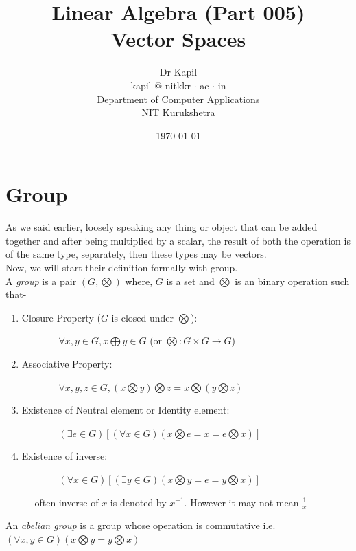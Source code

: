\documentclass{article}
\title{Linear Algebra (Part 005)\\Vector Spaces}
\author{Dr Kapil\\kapil $@$ nitkkr $\cdot$ ac $\cdot$ in\\Department of Computer Applications\\ NIT Kurukshetra}
\date{\today}
\begin{document}
\maketitle
\thispagestyle{fancy}

\section{Group}
As we said earlier, loosely speaking any thing or object that can be added together and after being multiplied by a scalar, the result of both the operation is of the same type, separately, then these types may be vectors.\\
Now, we will start their definition formally with group. \\

A \textit{group} is a pair $(G, \bigotimes)$ where, $G$ is a set and $\bigotimes$ is an binary operation such that- 
\begin{enumerate}
    \item Closure Property ($G$ is closed under $\bigotimes$): \par ~~~~~~~  \(\forall x, y \in G, x\bigoplus y \in G\) (or $\bigotimes:G \times G \rightarrow G$)
    
    \item Associative Property: \par~~~~~~~ \(\forall x, y, z \in G, (x \bigotimes y)\bigotimes z = x \bigotimes (y \bigotimes z)\)
    
    \item Existence of Neutral element or Identity element: \par ~~~~~~~ \((\exists e \in G) [(\forall x \in G) (x \bigotimes e = x = e \bigotimes x)]\)
    \item Existence of inverse: \par ~~~~~~~ \((\forall x \in G) [ (\exists y \in G)  (x \bigotimes y = e = y \bigotimes x )]\) \par ~~ often inverse of $x$ is denoted by $x^{-1}$. However it may not mean $\frac{1}{x}$
\end{enumerate}

An \textit{abelian group} is a group whose operation is commutative i.e. \((\forall x, y \in G)  (x \bigotimes y = y \bigotimes x)\)\\
\end{document}
